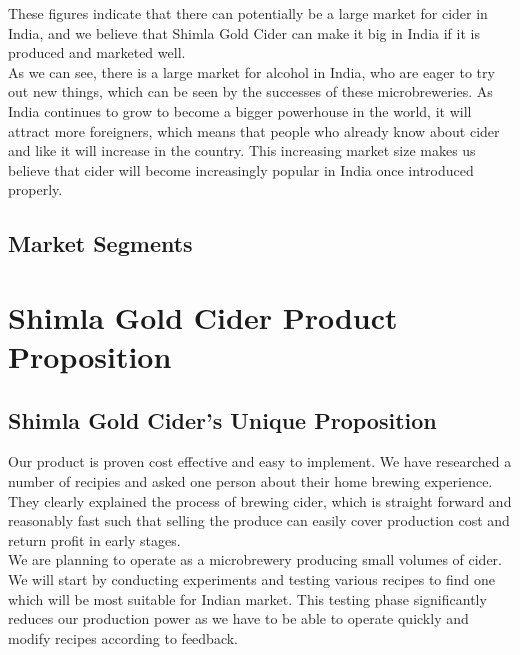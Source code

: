 \documentclass[11pt]{article}
\begin{document}
\noindent These figures indicate that there can potentially be a large market for cider in India, and we believe that Shimla Gold Cider can make it big in India if it is produced and marketed well. \\

\noindent As we can see, there is a large market for alcohol in India, who are eager to try out new things, which can be seen by the successes of these microbreweries. As India continues to grow to become a bigger powerhouse in the world, it will attract more foreigners, which means that people who already know about cider and like it will increase in the country. This increasing market size makes us believe that cider will become increasingly popular in India once introduced properly.

  \subsection{Market Segments}

\newpage
\section{Shimla Gold Cider Product Proposition}
  \subsection{Shimla Gold Cider's Unique Proposition}
Our product is proven cost effective and easy to implement. We have researched a number of recipies and asked one person about their home brewing experience. They clearly explained the process of brewing cider, which is straight forward and reasonably fast such that selling the produce can easily cover production cost and return profit in early stages. \\

\noindent We are planning to operate as a microbrewery producing small volumes of cider. We will start by conducting experiments and testing various recipes to find one which will be most suitable for Indian market. This testing phase significantly reduces our production power as we have to be able to operate quickly and modify recipes according to feedback. \\
\end{document}
